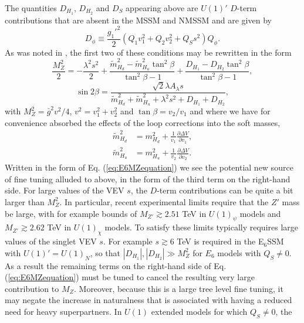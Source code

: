 \documentclass[preprint,amsmath,amssymb,aps,superscriptaddress,prd,showpacs,floatfix,nofootinbib]{revtex4-1}
\begin{document}
The quantities $D_{H_1}$, $D_{H_2}$ and $D_S$ appearing above are
$U(1)'$ $D$-term contributions that are absent in the MSSM and NMSSM
and are given by
\begin{equation}\label{eq:E6Dterms}
D_\phi\equiv \frac{g_1'^2}{2}\left (
Q_1v_1^2+Q_2v_2^2+Q_Ss^2\right
)Q_\phi.
\end{equation}
As was noted in \cite{Athron:2013ipa}, the first two of these
conditions may be rewritten in the form
\begin{equation}\label{eq:E6MZequation}
\frac{M_Z^2}{2}=-\frac{\lambda^2s^2}{2}+\frac{\tilde{m}_{H_d}^2-\tilde{m}_{H_u}^2\tan^2\beta}{\tan^2\beta-1}+\frac{D_{H_1}-D_{H_2}\tan^2\beta}{\tan^2\beta-1},
\end{equation}
\begin{equation}\label{eq:E6sin2bequation}
\sin 2\beta=\frac{\sqrt{2}\lambda A_{\lambda} s}{\tilde{m}_{H_d}^2+\tilde{m}_{H_u}^2+\lambda^2s^2+D_{H_1}+D_{H_2}},
\end{equation}
with $M_Z^2=\bar{g}^2v^2/4$, $v^2=v_1^2+v_2^2$ and $\tan\beta =
v_2/v_1$ and where we have for convenience absorbed the effects of the
loop corrections into the soft masses,
\begin{align*}
\tilde{m}_{H_d}^2&=m_{H_d}^2+\frac{1}{v_1}\frac{\partial \Delta
  V}{\partial
  v_1},\\ \tilde{m}_{H_u}^2&=m_{H_u}^2+\frac{1}{v_2}\frac{\partial
  \Delta V}{\partial v_2}.
\end{align*}
Written in the form of Eq. (\ref{eq:E6MZequation}) we see the
potential new source of fine tuning alluded to above, in the form of
the third term on the right-hand side. For large values of the VEV
$s$, the $D$-term contributions can be quite a bit larger than
$M_Z^2$. In particular, recent experimental limits \cite{Aad:2014cka}
require that the $Z'$ mass be large, with for example bounds of
$M_{Z'}\gtrsim 2.51$ TeV in $U(1)_\psi$ models and $M_{Z'}\gtrsim
2.62$ TeV in $U(1)_\chi$ models. To satisfy these
limits typically requires large values of the singlet VEV $s$. For
example $s\gtrsim 6$ TeV is required in the E$_6$SSM with
$U(1)'=U(1)_N$, so that $|D_{H_1}|,|D_{H_2}|\gg M_Z^2$ for $E_6$
models with $Q_S\neq 0$. As a result the remaining terms on the
right-hand side of Eq. (\ref{eq:E6MZequation}) must be tuned to cancel
the resulting very large contribution to $M_Z$. Moreover, because this
is a large tree level fine tuning, it may negate the increase in
naturalness that is associated with having a reduced need for heavy
superpartners. In $U(1)$ extended models for which $Q_S\neq 0$, the
\end{document}
